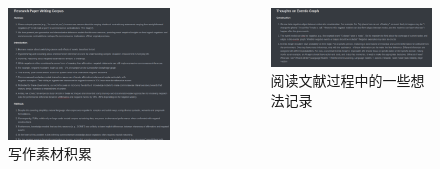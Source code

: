 \documentclass[10pt,aspectratio=43,mathserif]{beamer}
\begin{document}
        \begin{frame}
            \begin{columns}[b]
                \begin{figure}
                    \centering
                    \includegraphics[width=1.1\textwidth]{figures/corpus.png}
                    \caption{写作素材积累}
                    \label{fig:corpus}
                \end{figure}

                \begin{figure}
                    \centering
                    \includegraphics[width=1.1\textwidth]{figures/thoughts.png}
                    \caption{阅读文献过程中的一些想法记录}
                    \label{fig:thoughts}
                \end{figure}

            \end{columns}        
        \end{frame}
\end{document}
